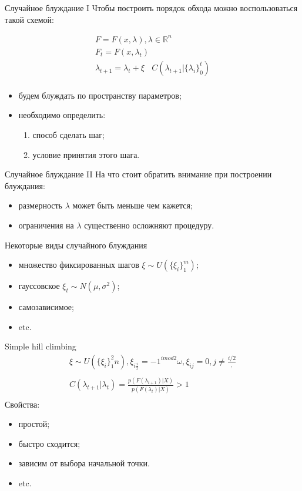 \documentclass[14pt, fleqn, xcolor={dvipsnames, table}]{beamer}
\begin{document}
\begin{frame}{Случайное блуждание I}
Чтобы построить порядок обхода можно воспользоваться такой схемой:

$$\begin{array}{l}
F = F(x, \lambda), \lambda \in \mathbb{R}^n \\
F_t = F(x, \lambda_t) \\
\lambda_{t+1} = \lambda_t + \xi~~~~C(\lambda_{t+1} | \{\lambda_i\}_0^t) \\
\end{array}$$

\begin{itemize}
  \item будем блуждать по пространству параметров;
  \item необходимо определить:
  \begin{enumerate}
    \item способ сделать шаг;
    \item условие принятия этого шага.
  \end{enumerate}
\end{itemize}
\end{frame}

\begin{frame}{Случайное блуждание II}
На что стоит обратить внимание при построении блуждания:
\begin{itemize}
  \item размерность $\lambda$ может быть меньше чем кажется;
  \item ограничения на $\lambda$ существенно осложняют процедуру.
\end{itemize}
\end{frame}


\begin{frame}{Некоторые виды случайного блуждания}
\begin{itemize}
  \item множество фиксированных шагов $\xi \sim U(\{\xi_i\}_1^m)$;
  \item гауссовское $\xi_t \sim N(\mu, \sigma^2)$;
  \item самозависимое;
  \item etc.
\end{itemize}
\end{frame}

\begin{frame}{Simple hill climbing}
$$\begin{array}{l}
\xi \sim U(\{\xi_i\}_1^2n), \xi_{i\frac{i}{2}} = -1^{i mod 2}\omega, \xi_{ij} = 0, j \neq \frac{i/2},\\
\\
C(\lambda_{t+1}|\lambda_t) = \frac{p(F(\lambda_{t+1})|X)}{p(F(\lambda_t)|X)} > 1 \\
\end{array}$$
Свойства:
\begin{itemize}
  \item простой;
  \item быстро сходится;
  \item зависим от выбора начальной точки.
  \item etc.
\end{itemize}
\end{frame}
\end{document}
